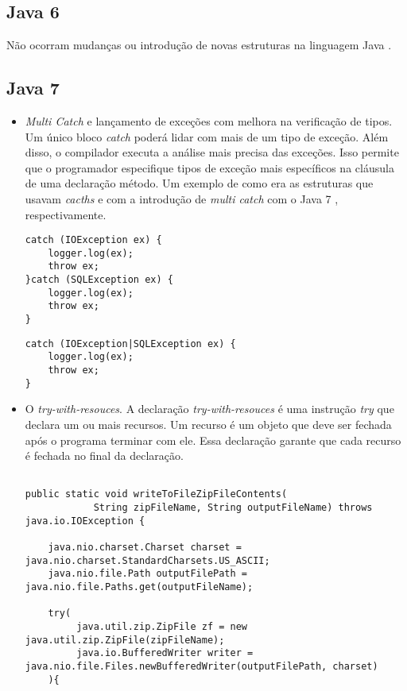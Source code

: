   
  
	\subsection {Java 6}
		Não ocorram mudanças ou introdução de novas estruturas na linguagem Java \cite{JSE8_Enhancements}.
	
	\subsection {Java 7}
		\begin{itemize}
		  \item {\it Multi Catch} e lançamento de exceções com melhora na verificação de tipos. Um único bloco {\it catch} poderá lidar com mais de um tipo de exceção. Além disso, o compilador executa a análise mais precisa das exceções. Isso permite que o programador especifique tipos de exceção mais específicos na cláusula de uma declaração método. Um exemplo de como era as estruturas que usavam {\it cacths} e com a introdução de {\it multi catch} com o Java 7 \cite{JSE7}, respectivamente.
  

\begin{lstlisting}
catch (IOException ex) {
	logger.log(ex);
	throw ex;
}catch (SQLException ex) {
	logger.log(ex);
	throw ex;
}
\end{lstlisting}
\clearpage
\begin{lstlisting}
catch (IOException|SQLException ex) {
	logger.log(ex);
	throw ex;
}
\end{lstlisting}


 \item O {\it try-with-resouces}. A declaração {\it try-with-resouces} é uma instrução {\it try} que declara um ou mais recursos. Um recurso é um objeto que deve ser fechada após o programa terminar com ele. Essa declaração garante que cada recurso é fechada no final da declaração\cite{JSE7_Advanced}.
	 
\begin{lstlisting}

public static void writeToFileZipFileContents(
			String zipFileName, String outputFileName) throws java.io.IOException {
	
	java.nio.charset.Charset charset = java.nio.charset.StandardCharsets.US_ASCII;
	java.nio.file.Path outputFilePath = java.nio.file.Paths.get(outputFileName);
	
	try(
		 java.util.zip.ZipFile zf = new java.util.zip.ZipFile(zipFileName);
		 java.io.BufferedWriter writer = java.nio.file.Files.newBufferedWriter(outputFilePath, charset)
	){
	

\end{lstlisting}
\end{itemize}
